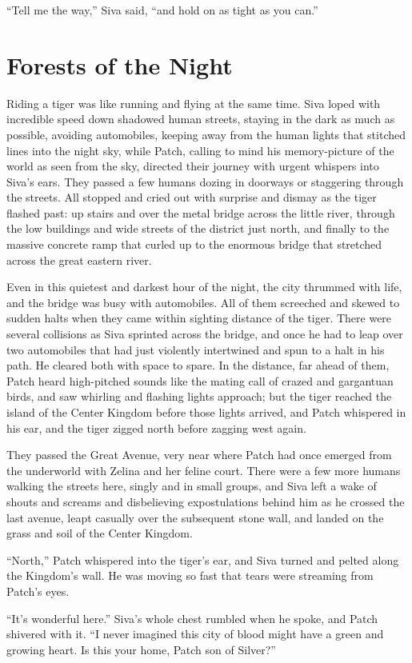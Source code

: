 \documentclass[ebook,oneside,openany,17pt]{memoir}
\renewcommand{\thechapter}{\Roman{chapter}}
\newcounter{sections}
\newcommand{\sections}[1]{%
  \section*{#1}
  \addtocounter{sections}{1}%
  \pdfbookmark[1]{#1}{section.\thechapter.\thesections}}
\begin{document}
“Tell me the way,” Siva said, “and hold on as tight as you can.”


\sections{Forests of the Night}

Riding a tiger was like running and flying at the same time. Siva
loped with incredible speed down shadowed human streets, staying in
the dark as much as possible, avoiding automobiles, keeping away from
the human lights that stitched lines into the night sky, while Patch,
calling to mind his memory-picture of the world as seen from the sky,
directed their journey with urgent whispers into Siva’s ears. They
passed a few humans dozing in doorways or staggering through the
streets. All stopped and cried out with surprise and dismay as the
tiger flashed past: up stairs and over the metal bridge across the
little river, through the low buildings and wide streets of the
district just north, and finally to the massive concrete ramp that
curled up to the enormous bridge that stretched across the great
eastern river.

Even in this quietest and darkest hour of the night, the city thrummed
with life, and the bridge was busy with automobiles. All of them
screeched and skewed to sudden halts when they came within sighting
distance of the tiger. There were several collisions as Siva sprinted
across the bridge, and once he had to leap over two automobiles that
had just violently intertwined and spun to a halt in his path. He
cleared both with space to spare. In the distance, far ahead of them,
Patch heard high-pitched sounds like the mating call of crazed and
gargantuan birds, and saw whirling and flashing lights approach; but
the tiger reached the island of the Center Kingdom before those lights
arrived, and Patch whispered in his ear, and the tiger zigged north
before zagging west again.

They passed the Great Avenue, very near where Patch had once emerged
from the underworld with Zelina and her feline court. There were a few
more humans walking the streets here, singly and in small groups, and
Siva left a wake of shouts and screams and disbelieving expostulations
behind him as he crossed the last avenue, leapt casually over the
subsequent stone wall, and landed on the grass and soil of the Center
Kingdom.

“North,” Patch whispered into the tiger’s ear, and Siva turned and
pelted along the Kingdom’s wall. He was moving so fast that tears were
streaming from Patch’s eyes.

“It’s wonderful here.” Siva’s whole chest rumbled when he spoke, and
Patch shivered with it. “I never imagined this city of blood might
have a green and growing heart. Is this your home, Patch son of
Silver?”
\end{document}
